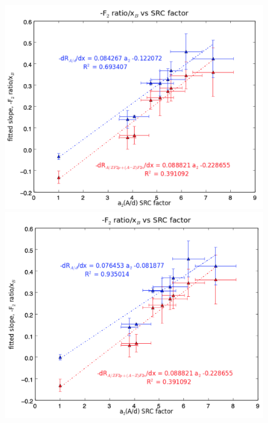 \documentclass[oneside]{article}
\begin{document}
\begin{figure}[H]
\begin{minipage}{0.5\textwidth}
      	  \includegraphics[width=\textwidth]{plots/a2SRC.png}
      	  \end{minipage}\hfill\begin{minipage}{0.5\textwidth}
      	        	  \includegraphics[width=\textwidth]{plots/a2SRCfixed.png}
\end{minipage}
 	 \caption[]{}
  \label{fig:a2_src}
 \end{figure}
 
\end{document}
